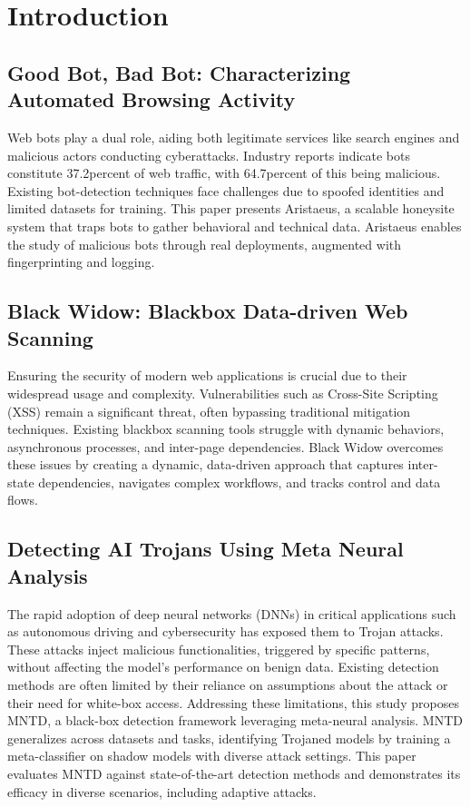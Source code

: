 \documentclass[conference]{IEEEtran}
\begin{document}
\section{Introduction}
\subsection{\textbf{Good Bot, Bad Bot: Characterizing Automated Browsing Activity}}
 Web bots play a dual role, aiding both legitimate services like search engines and malicious actors conducting cyberattacks. Industry reports indicate bots constitute 37.2percent of web traffic, with 64.7percent of this being malicious. Existing bot-detection techniques face challenges due to spoofed identities and limited datasets for training.
This paper presents Aristaeus, a scalable honeysite system that traps bots to gather behavioral and technical data. Aristaeus enables the study of malicious bots through real deployments, augmented with fingerprinting and logging.

\subsection{\textbf{Black Widow: Blackbox Data-driven Web Scanning}}
Ensuring the security of modern web applications is crucial due to their widespread usage and complexity. Vulnerabilities such as Cross-Site Scripting (XSS) remain a significant threat, often bypassing traditional mitigation techniques. Existing blackbox scanning tools struggle with dynamic behaviors, asynchronous processes, and inter-page dependencies.
Black Widow overcomes these issues by creating a dynamic, data-driven approach that captures inter-state dependencies, navigates complex workflows, and tracks control and data flows.

\subsection{\textbf{Detecting AI Trojans Using Meta Neural Analysis}}
The rapid adoption of deep neural networks (DNNs) in critical applications such as autonomous driving and cybersecurity has exposed them to Trojan attacks. These attacks inject malicious functionalities, triggered by specific patterns, without affecting the model’s performance on benign data. Existing detection methods are often limited by their reliance on assumptions about the attack or their need for white-box access. Addressing these limitations, this study proposes MNTD, a black-box detection framework leveraging meta-neural analysis. MNTD generalizes across datasets and tasks, identifying Trojaned models by training a meta-classifier on shadow models with diverse attack settings. This paper evaluates MNTD against state-of-the-art detection methods and demonstrates its efficacy in diverse scenarios, including adaptive attacks.
\end{document}
